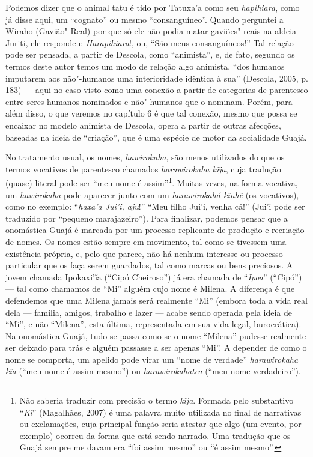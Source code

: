 Podemos dizer que o animal tatu é tido por Tatuxa'a como seu
\emph{hapihiara}, como já disse aqui, um ``cognato'' ou mesmo
``consanguíneo''. Quando perguntei a Wiraho (Gavião"-Real) por que só ele
não podia matar gaviões"-reais na aldeia Juriti, ele respondeu:
\emph{Harapihiara}!, ou, ``São meus consanguíneos!'' Tal relação pode
ser pensada, a partir de Descola, como ``animista'', e, de fato, segundo
os termos deste autor temos um modo de relação algo animista, ``dos
humanos imputarem aos não"-humanos uma interioridade idêntica à sua''
(Descola, 2005, p. 183) --- aqui no caso visto como uma conexão a partir de
categorias de parentesco entre seres humanos nominados e não"-humanos que
o nominam. Porém, para além disso, o que veremos no capítulo 6 é que tal
conexão, mesmo que possa se encaixar no modelo animista de Descola,
opera a partir de outras afecções, baseadas na ideia de ``criação'', que
é uma espécie de motor da socialidade Guajá.

No tratamento usual, os nomes, \emph{hawirokaha}, são menos utilizados
do que os termos vocativos de parentesco chamados \emph{harawirokaha
kĩja}, cuja tradução (quase) literal pode ser ``meu nome é
assim''\footnote{Não saberia traduzir com precisão o termo \emph{kĩja}.
  Formada pelo substantivo ``\emph{Kĩ}'' (Magalhães, 2007) é uma palavra
  muito utilizada no final de narrativas ou exclamações, cuja principal
  função seria atestar que algo (um evento, por exemplo) ocorreu da
  forma que está sendo narrado. Uma tradução que os Guajá sempre me
  davam era ``foi assim mesmo'' ou ``é assim mesmo''.}. Muitas vezes, na
forma vocativa, um \emph{hawirokaha} pode aparecer junto com um
\emph{harawirokahá kĩnhẽ} (os vocativos), como no exemplo: ``\emph{haxa'a
Jui'i, aju}!'' ``Meu filho Jui'i, venha cá!'' (Jui'i pode ser traduzido por
``pequeno marajazeiro''). Para finalizar, podemos pensar que a
onomástica Guajá é marcada por um processo replicante de produção e
recriação de nomes. Os nomes estão sempre em movimento, tal como se
tivessem uma existência própria, e, pelo que parece, não há nenhum
interesse ou processo particular que os faça serem guardados, tal como
marcas ou bens preciosos. A jovem chamada Ipokaxi'ĩa (``Cipó Cheiroso'')
já era chamada de ``\emph{Ipoa}'' (``Cipó'') --- tal como chamamos de ``Mi''
alguém cujo nome é Milena. A diferença é que defendemos que uma Milena
jamais será realmente ``Mi'' (embora toda a vida real dela --- família,
amigos, trabalho e lazer --- acabe sendo operada pela ideia de ``Mi'', e
não ``Milena'', esta última, representada em sua vida legal,
burocrática). Na onomástica Guajá, tudo se passa como se o nome
``Milena'' pudesse realmente ser deixado para trás e alguém passasse a
ser apenas ``Mi''. A depender de como o nome se comporta, um apelido
pode virar um ``nome de verdade'' \emph{harawirokaha kĩa} (``meu nome é
assim mesmo'') ou \emph{harawirokahatea} (``meu nome verdadeiro'').

